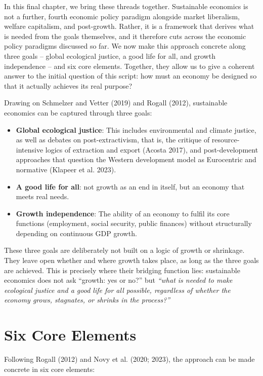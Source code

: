 \documentclass[
  british,
  a4paper,
  DIV=11,
  numbers=noendperiod,
  oneside,
  openany]{scrreprt}
\begin{document}
In this final chapter, we bring these threads together. Sustainable
economics is not a further, fourth economic policy paradigm alongside
market liberalism, welfare capitalism, and post-growth. Rather, it is a
framework that derives what is needed from the goals themselves, and it
therefore cuts across the economic policy paradigms discussed so far. We
now make this approach concrete along three goals -- global ecological
justice, a good life for all, and growth independence -- and six core
elements. Together, they allow us to give a coherent answer to the
initial question of this script: how must an economy be designed so that
it actually achieves its real purpose?

Drawing on Schmelzer and Vetter (2019) and Rogall (2012), sustainable
economics can be captured through three goals:

\begin{itemize}
\item
  \textbf{Global ecological justice}: This includes environmental and
  climate justice, as well as debates on post-extractivism, that is, the
  critique of resource-intensive logics of extraction and export (Acosta
  2017), and post-development approaches that question the Western
  development model as Eurocentric and normative (Klapeer et al. 2023).
\item
  \textbf{A good life for all}: not growth as an end in itself, but an
  economy that meets real needs.
\item
  \textbf{Growth independence}: The ability of an economy to fulfil its
  core functions (employment, social security, public finances) without
  structurally depending on continuous GDP growth.
\end{itemize}

These three goals are deliberately not built on a logic of growth or
shrinkage. They leave open whether and where growth takes place, as long
as the three goals are achieved. This is precisely where their bridging
function lies: sustainable economics does not ask ``growth: yes or no?''
but \emph{``what is needed to make ecological justice and a good life
for all possible, regardless of whether the economy grows, stagnates, or
shrinks in the process?''}

\section{Six Core Elements}\label{six-core-elements}

Following Rogall (2012) and Novy et al. (2020; 2023), the approach can
be made concrete in six core elements:
\end{document}
